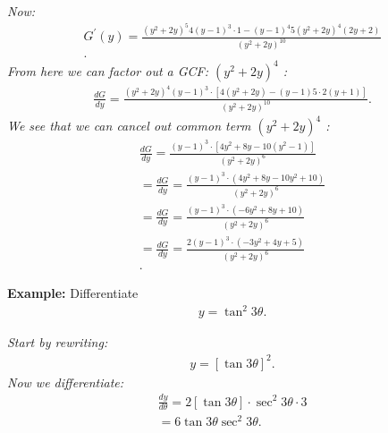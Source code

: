 \documentclass{report}
\begin{document}
  \bigbreak \noindent 
  \textit{Now:}
  \begin{align*}
    G^{\prime}(y) =  \frac{(y^{2}+2y)^{5}4(y-1)^{3} \cdot 1 - (y-1)^{4}5(y^{2}+2y)^{4}(2y+2)}{(y^{2}+2y)^{10}} \\
  .\end{align*}
  \bigbreak \noindent 
  \textit{From here we can factor out a GCF: $(y^{2}+2y)^{4}$ :}
  \begin{align*}
    \frac{dG}{dy} = \frac{(y^{2}+2y)^{4}(y-1)^{3} \cdot [4(y^{2}+2y)-(y-1)5\cdot 2(y+1)]}{(y^{2}+2y)^{10}}
  .\end{align*}
  \bigbreak \noindent 
  \textit{We see that we can cancel out common term $(y^{2}+2y)^4$ :}
  \begin{align*}
    \frac{dG}{dy} = \frac{(y-1)^{3} \cdot [4y^{2}+8y-10(y^{2}-1)]}{(y^{2}+2y)^{6}} \\
    = \frac{dG}{dy} = \frac{(y-1)^{3} \cdot (4y^{2}+8y-10y^{2}+10)}{(y^{2}+2y)^{6}} \\
    = \frac{dG}{dy} = \frac{(y-1)^{3} \cdot (-6y^{2}+8y+10)}{(y^{2}+2y)^{6}} \\
    = \frac{dG}{dy} = \frac{2(y-1)^{3} \cdot (-3y^{2}+4y+5)}{(y^{2}+2y)^{6}} \\
  .\end{align*}

  \bigbreak \noindent 
  \begin{mdframed}
    \textbf{Example:} Differentiate
    \begin{align*}
      y = \tan^{2}{3\theta}
    .\end{align*}
  \end{mdframed}
  \bigbreak \noindent 
  \textit{Start by rewriting:}
  \begin{align*}
    y = [\tan{3\theta}]^{2}
  .\end{align*}
  \bigbreak \noindent 
  \textit{Now we differentiate:}
  \begin{align*}
    \frac{dy}{d\theta} = 2[\tan{3\theta}] \cdot \sec^{2}{3\theta} \cdot 3 \\ 
    = 6\tan{3\theta }\sec^{2}{3\theta }
  .\end{align*}
\end{document}

